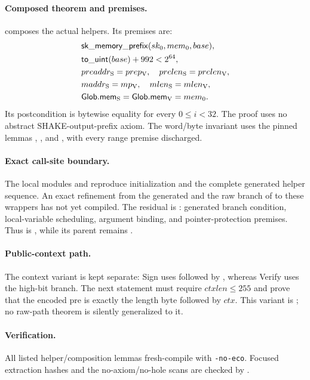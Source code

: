 \paragraph{Composed theorem and premises.}
 composes the actual
helpers. Its premises are:
\begin{align*}
  &\mathsf{sk\_memory\_prefix}(sk_0,mem_0,base),\\
  &\mathsf{to\_uint}(base)+992 < 2^{64},\\
  &preaddr_{\rm S}=prep_{\rm V},\quad prelen_{\rm S}=prelen_{\rm V},\\
  &maddr_{\rm S}=mp_{\rm V},\quad mlen_{\rm S}=mlen_{\rm V},\\
  &\mathsf{Glob.mem}_{\rm S}=\mathsf{Glob.mem}_{\rm V}=mem_0.
\end{align*}
Its postcondition is bytewise equality for every \(0\leq i<32\). The proof
uses no abstract SHAKE-output-prefix axiom. The word/byte invariant uses the
pinned lemmas ,
, and
, with every range premise discharged.

\paragraph{Exact call-site boundary.}
The local modules  and
 reproduce initialization and the complete
generated helper sequence. An exact refinement from the generated
 and the raw branch of
 to these wrappers has not yet compiled.
The residual is : generated branch condition,
local-variable scheduling, argument binding, and pointer-protection premises.
Thus  is , while its parent
 remains .

\paragraph{Public-context path.}
The context variant is kept separate: Sign uses
 followed by
, whereas Verify uses the high-bit branch.
The next statement must require \(ctxlen\leq255\) and prove that the encoded pre
is exactly the length byte followed by \(ctx\). This variant is
; no raw-path theorem is silently generalized to it.

\paragraph{Verification.}
All listed helper/composition lemmas fresh-compile with \texttt{-no-eco}.
Focused extraction hashes and the no-axiom/no-hole scans are checked by
.
